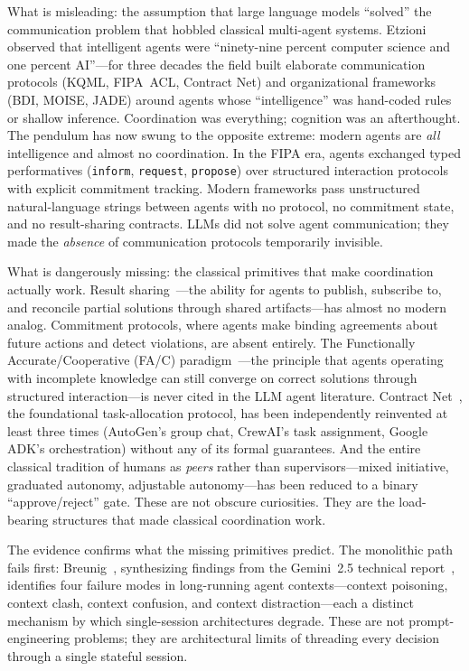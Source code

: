 \documentclass{article}
\begin{document}
What is misleading: the assumption that large language models ``solved'' the communication
problem that hobbled classical multi-agent systems.
Etzioni~\citep{etzioni1994softbots} observed that intelligent agents were ``ninety-nine
percent computer science and one percent AI''---for three decades the field built
elaborate communication protocols (KQML, FIPA~ACL, Contract Net) and organizational
frameworks (BDI, MOISE, JADE) around agents whose ``intelligence'' was hand-coded rules
or shallow inference.  Coordination was everything; cognition was an afterthought.  The
pendulum has now swung to the opposite extreme: modern agents are \emph{all} intelligence
and almost no coordination.  In the FIPA era, agents exchanged typed performatives
(\texttt{inform}, \texttt{request}, \texttt{propose}) over structured interaction
protocols with explicit commitment tracking.  Modern frameworks pass unstructured
natural-language strings between agents with no protocol, no commitment state, and no
result-sharing contracts.  LLMs did not solve agent communication; they made the
\emph{absence} of communication protocols temporarily invisible.

What is dangerously missing: the classical primitives that make coordination actually
work.  Result sharing~\citep{durfee1987cooperation}---the ability for agents to publish,
subscribe to, and reconcile partial solutions through shared artifacts---has almost no
modern analog.  Commitment protocols, where agents make binding agreements about future
actions and detect violations, are absent entirely.  The Functionally
Accurate/Cooperative (FA/C) paradigm~\citep{lesser1983functionally}---the principle that
agents operating with incomplete knowledge can still converge on correct solutions
through structured interaction---is never cited in the LLM agent literature.  Contract
Net~\citep{smith1980contract}, the foundational task-allocation protocol, has been
independently reinvented at least three times (AutoGen's group chat, CrewAI's task
assignment, Google ADK's orchestration) without any of its formal guarantees.  And the
entire classical tradition of humans as \emph{peers} rather than supervisors---mixed
initiative, graduated autonomy, adjustable autonomy---has been reduced to a binary
``approve/reject'' gate.  These are not obscure curiosities.  They are the load-bearing
structures that made classical coordination work.

The evidence confirms what the missing primitives predict.  The monolithic path fails
first: Breunig~\citep{breunig2025contexts}, synthesizing findings from the
Gemini~2.5 technical report~\citep{gemini2025technical}, identifies four failure modes in
long-running agent contexts---context poisoning, context clash, context confusion, and
context distraction---each a distinct mechanism by which single-session architectures
degrade.  These are not prompt-engineering problems; they are architectural limits of
threading every decision through a single stateful session.
\end{document}
